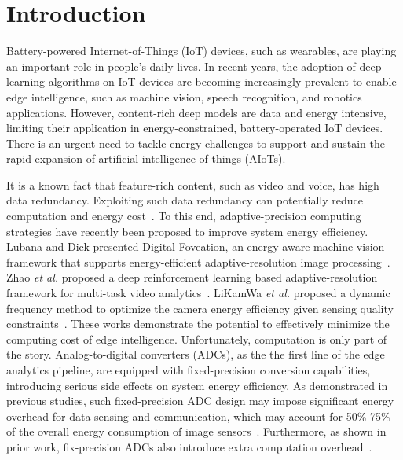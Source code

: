 \section{Introduction}

Battery-powered Internet-of-Things (IoT) devices, such as wearables, are playing an important role in people's daily lives.
In recent years, the adoption of deep learning algorithms on IoT devices are becoming increasingly prevalent to enable edge
intelligence, such as machine vision, speech recognition, and robotics applications. However, content-rich deep models are data 
and energy intensive, limiting their application in energy-constrained, battery-operated IoT devices. There is an urgent need to 
tackle energy challenges to support and sustain the rapid expansion of artificial intelligence of things (AIoTs).

It is a known fact that feature-rich content, such as video and voice, has high data redundancy. Exploiting such data redundancy
can potentially reduce computation and energy cost~\cite{lubana_digital_2018, zhao_reinforcement-learning-based_2022}. 
To this end, adaptive-precision computing strategies have recently been proposed to improve system energy efficiency. 
Lubana and Dick presented Digital Foveation, an energy-aware machine vision framework that supports energy-efficient adaptive-resolution image processing~\cite{lubana_digital_2018}. 
Zhao {\it et al.} proposed a deep reinforcement learning based adaptive-resolution framework for multi-task video analytics~\cite{zhao_reinforcement-learning-based_2022}. 
LiKamWa {\it et al.} proposed a dynamic frequency method to optimize the camera energy efficiency given sensing quality constraints~\cite{likamwa_energy_2013}. These works demonstrate the potential to effectively minimize the computing cost of edge intelligence. 
Unfortunately, computation is only part of the story. Analog-to-digital converters (ADCs), as the the first line of the edge 
analytics pipeline, are equipped with fixed-precision conversion capabilities, introducing serious side effects on system energy 
efficiency.  As demonstrated in previous studies, such fixed-precision ADC design may impose significant energy overhead for
data sensing and communication, which may account for 50\%-75\% of the overall energy consumption of 
image sensors~\cite{choi_energyillumination-adaptive_2015,takayanagi_125-inch_2005,kitamura_33-megapixel_2012}. Furthermore, as shown in 
prior work, fix-precision ADCs also introduce extra computation overhead~\cite{likamwa_redeye_2016, lubana_digital_2018}. 


